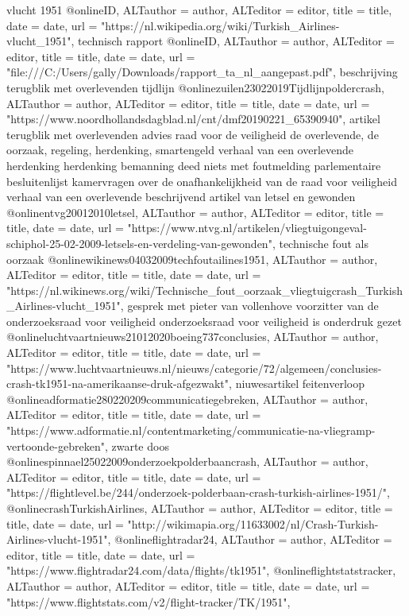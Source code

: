 vlucht 1951
@online{ID,	ALTauthor = {author},	ALTeditor = {editor},	title = {title},	date = {date},	url = {"https://nl.wikipedia.org/wiki/Turkish_Airlines-vlucht_1951"},}
technisch rapport
@online{ID,	ALTauthor = {author},	ALTeditor = {editor},	title = {title},	date = {date},	url = {"file:///C:/Users/gally/Downloads/rapport_ta_nl_aangepast.pdf"},}
beschrijving
terugblik met overlevenden
tijdlijn
@online{zuilen23022019Tijdlijnpoldercrash,	ALTauthor = {author},	ALTeditor = {editor},	title = {title},	date = {date},	url = {"https://www.noordhollandsdagblad.nl/cnt/dmf20190221_65390940"},}
artikel
terugblik met overlevenden
advies raad voor de veiligheid
de overlevende, de oorzaak, regeling, herdenking, smartengeld
verhaal van een overlevende
herdenking
herdenking
bemanning deed niets met foutmelding
parlementaire besluitenlijst
kamervragen over de onafhankelijkheid van de raad voor veiligheid
verhaal van een overlevende
beschrijvend artikel van letsel en gewonden
@online{ntvg20012010letsel,	ALTauthor = {author},	ALTeditor = {editor},	title = {title},	date = {date},	url = {"https://www.ntvg.nl/artikelen/vliegtuigongeval-schiphol-25-02-2009-letsels-en-verdeling-van-gewonden"},}
technische fout als oorzaak
@online{wikinews04032009techfoutailines1951,	ALTauthor = {author},	ALTeditor = {editor},	title = {title},	date = {date},	url = {"https://nl.wikinews.org/wiki/Technische_fout_oorzaak_vliegtuigcrash_Turkish_Airlines-vlucht_1951"},}
gesprek met pieter van vollenhove voorzitter van de onderzoeksraad voor veiligheid
onderzoeksraad voor veiligheid is onderdruk gezet
@online{luchtvaartnieuws21012020boeing737conclusies,	ALTauthor = {author},	ALTeditor = {editor},	title = {title},	date = {date},	url = {"https://www.luchtvaartnieuws.nl/nieuws/categorie/72/algemeen/conclusies-crash-tk1951-na-amerikaanse-druk-afgezwakt"},}
niuwesartikel
feitenverloop
@online{adformatie280220209communicatiegebreken,	ALTauthor = {author},	ALTeditor = {editor},	title = {title},	date = {date},	url = {"https://www.adformatie.nl/contentmarketing/communicatie-na-vliegramp-vertoonde-gebreken"},}
zwarte doos
@online{spinnael25022009onderzoekpolderbaancrash,	ALTauthor = {author},	ALTeditor = {editor},	title = {title},	date = {date},	url = {"https://flightlevel.be/244/onderzoek-polderbaan-crash-turkish-airlines-1951/"},}
@online{crashTurkishAirlines,	ALTauthor = {author},	ALTeditor = {editor},	title = {title},	date = {date},	url = {"http://wikimapia.org/11633002/nl/Crash-Turkish-Airlines-vlucht-1951"},}
@online{flightradar24,	ALTauthor = {author},	ALTeditor = {editor},	title = {title},	date = {date},	url = {"https://www.flightradar24.com/data/flights/tk1951"},}
@online{flightstatstracker,	ALTauthor = {author},	ALTeditor = {editor},	title = {title},	date = {date},	url = {"https://www.flightstats.com/v2/flight-tracker/TK/1951"},}

